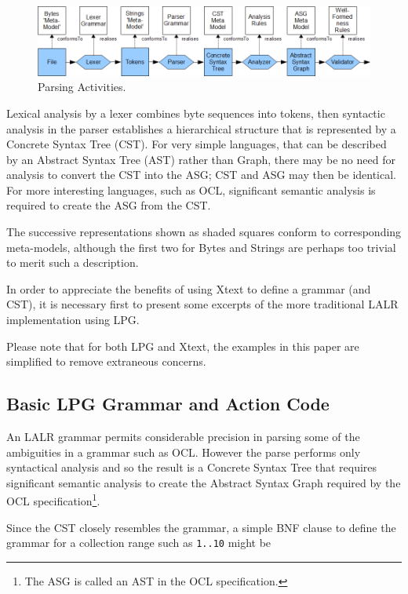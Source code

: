 \documentclass{eceasst}
\begin{document}
\begin{figure}
  \begin{center}
    \includegraphics[width=4.75in]{ParsingPhases.png}
  \end{center}
  \caption{Parsing Activities.}
  \label{fig:ParsingActivities}
\end{figure}

Lexical analysis by a lexer combines byte sequences into tokens, then syntactic analysis in the parser establishes a hierarchical structure that is represented by a Concrete Syntax Tree (CST). For very simple languages, that can be described by an Abstract Syntax Tree (AST) rather than Graph, there may be no need for analysis to convert the CST into the ASG; CST and ASG may then be identical.  For more interesting languages, such as OCL, significant semantic analysis is required to create the ASG from the CST.

The successive representations shown as shaded squares conform to corresponding meta-models, although the first two for Bytes and Strings are perhaps too trivial to merit such a description. 

In order to appreciate the benefits of using Xtext to define a grammar (and CST), it is necessary first to present some excerpts of the more traditional LALR\cite{dragon} implementation using LPG\cite{LPG}.

Please note that for both LPG and Xtext, the examples in this paper are simplified to remove extraneous concerns.

\subsection{Basic LPG Grammar and Action Code}

An LALR grammar permits considerable precision in parsing some of the ambiguities in a grammar such as OCL. However the parse performs only syntactical analysis and so the result is a Concrete Syntax Tree that requires significant semantic analysis to create the Abstract Syntax Graph required by the OCL specification\footnote{The ASG is called an AST in the OCL specification.}.

Since the CST closely resembles the grammar, a simple BNF\cite{dragon} clause to define the grammar for a collection range such as \verb+1..10+ might be
\end{document}
